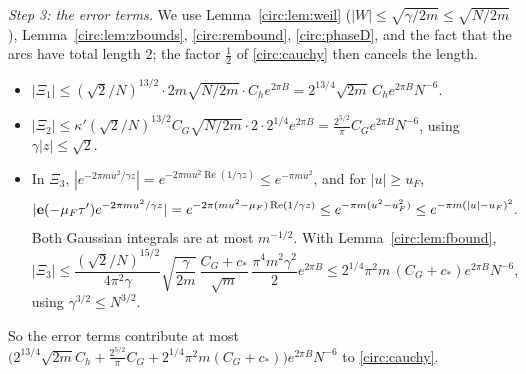 \emph{Step 3: the error terms.} We use Lemma~\ref{circ:lem:weil} ($|W|\le\sqrt{\gamma/2m}\le\sqrt{N/2m}$), Lemma~\ref{circ:lem:zbounds}, \eqref{circ:rembound}, \eqref{circ:phaseD}, and the fact that the arcs have total length $2$; the factor $\frac12$ of \eqref{circ:cauchy} then cancels the length.
\begin{itemize}
\item $|\Xi_1|\le(\sqrt2/N)^{13/2}\cdot2m\sqrt{N/2m}\cdot C_he^{2\pi B}=2^{13/4}\sqrt{2m}\,C_he^{2\pi B}N^{-6}$.
\item $|\Xi_2|\le\kappa'(\sqrt2/N)^{13/2}C_G\sqrt{N/2m}\cdot2\cdot2^{1/4}e^{2\pi B}=\frac{2^{5/2}}\pi C_Ge^{2\pi B}N^{-6}$, using $\gamma|z|\le\sqrt2$.
\item In $\Xi_3$, $|e^{-2\pi mu^2/\gamma z}|=e^{-2\pi mu^2\operatorname{Re}(1/\gamma z)}\le e^{-\pi mu^2}$, and for $|u|\ge u_F$,
\[
|\mathbf e(-\mu_F\tau')e^{-2\pi mu^2/\gamma z}|=e^{-2\pi(mu^2-\mu_F)\operatorname{Re}(1/\gamma z)}\le e^{-\pi m(u^2-u_F^2)}\le e^{-\pi m(|u|-u_F)^2}.
\] Both Gaussian integrals are at most $m^{-1/2}$. With Lemma~\ref{circ:lem:fbound},
\[
|\Xi_3|\le\frac{(\sqrt2/N)^{15/2}}{4\pi^2\gamma}\sqrt{\frac\gamma{2m}}\,\frac{C_G+c_*}{\sqrt m}\,\frac{\pi^4m^2\gamma^2}2e^{2\pi B}\le2^{1/4}\pi^2m\,(C_G+c_*)e^{2\pi B}N^{-6},
\]
using $\gamma^{3/2}\le N^{3/2}$.
\end{itemize}
So the error terms contribute at most $\big(2^{13/4}\sqrt{2m}C_h+\frac{2^{5/2}}\pi C_G+2^{1/4}\pi^2m(C_G+c_*)\big)e^{2\pi B}N^{-6}$ to \eqref{circ:cauchy}.

